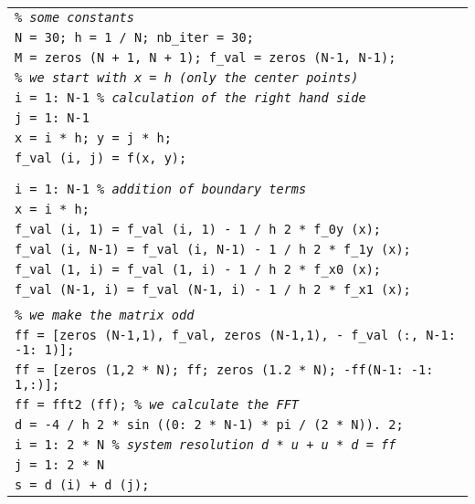 \begin{listing} 
\begin{footnotesize}
\noindent
{\upshape
\begin{tabular}{l} \texttt{\textit{\% some constants}} \\
\texttt{N = 30; h = 1 / N; nb\_iter = 30;} \\
\texttt{M = zeros (N + 1, N + 1); f\_val = zeros (N-1, N-1);} \\
\texttt{\textit{\% we start with x = h (only the center points)}} \\
\texttt{\pfor i = 1: N-1 \textit{\% calculation of the right hand side}} \\
\quad \texttt{\pfor j = 1: N-1} \\
\quad \quad \texttt{x = i * h; y = j * h;} \\
\quad \quad \texttt{f\_val (i, j) = f(x, y);} \\
\quad \texttt{\pend} \\
\texttt{\pend} \\
\texttt{\pfor i = 1: N-1 \textit{\% addition of boundary terms}} \\
\quad \texttt{x = i * h;} \\
\quad \texttt{f\_val (i, 1) = f\_val (i, 1) - 1 / h{\hatverb} 2 * f\_0y (x);} \\
\quad \texttt{f\_val (i, N-1) = f\_val (i, N-1) - 1 / h{\hatverb} 2 * f\_1y (x);} \\
\quad \texttt{f\_val (1, i) = f\_val (1, i) - 1 / h{\hatverb} 2 * f\_x0 (x);} \\
\quad \texttt{f\_val (N-1, i) = f\_val (N-1, i) - 1 / h{\hatverb} 2 * f\_x1 (x);} \\
\texttt{\pend} \\
\texttt{\textit{\% we make the matrix odd}} \\
\texttt{ff = [zeros (N-1,1), f\_val, zeros (N-1,1), - f\_val (:, N-1: -1: 1)];} \\
\texttt{ff = [zeros (1,2 * N); ff; zeros (1.2 * N); -ff(N-1: -1: 1,:)];} \\
\texttt{ff = fft2 (ff); \textit{\% we calculate the FFT}} \\
\texttt{d = -4 / h{\hatverb} 2 * sin ((0: 2 * N-1) * pi / (2 * N)).{\hatverb} 2;} \\
\texttt{\pfor i = 1: 2 * N \textit{\% system resolution d * u + u * d = ff}} \\
\quad \texttt{\pfor j = 1: 2 * N} \\
\quad \quad \texttt{s = d (i) + d (j);} \\

\end{tabular}}
\end{footnotesize}
\end{listing}
